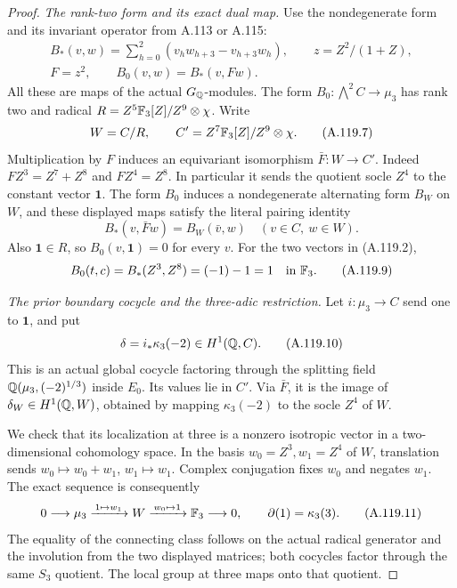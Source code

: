 \begin{proof}
\emph{The rank-two form and its exact dual map.}
Use the nondegenerate form and its invariant operator
from A.113 or A.115:
\[
 \begin{gathered}
 B_*(v,w)=\sum_{h=0}^2(v_hw_{h+3}-v_{h+3}w_h),
 \qquad z=Z^2/(1+Z),\\
 F=z^2,\qquad B_0(v,w)=B_*(v,Fw).
 \end{gathered}
 \tag{A.119.6}
\]
All these are maps of the actual \(G_\mathbb Q\)-modules.
The form \(B_0:\bigwedge^2C\to\mu_3\) has rank two
and radical \(R=Z^5\mathbb F_3[Z]/Z^9\otimes\chi\).
Write
\[
 W=C/R,\qquad C'=Z^7\mathbb F_3[Z]/Z^9\otimes\chi.
 \tag{A.119.7}
\]
Multiplication by \(F\) induces an equivariant
isomorphism \(\bar F:W\longrightarrow C'\).
Indeed \(FZ^3=Z^7+Z^8\) and \(FZ^4=Z^8\).
In particular it sends the quotient socle \(Z^4\)
to the constant vector \(\mathbf1\).
The form \(B_0\) induces a nondegenerate alternating
form \(B_W\) on \(W\), and these displayed maps
satisfy the literal pairing identity
\[
 B_*(v,\bar Fw)=B_W(\bar v,w)
                         \quad(v\in C,\ w\in W).
 \tag{A.119.8}
\]
Also \(\mathbf1\in R\), so
\(B_0(v,\mathbf1)=0\) for every \(v\).
For the two vectors in (A.119.2),
\[
       B_0(t,c)=B_*(Z^3,Z^8)=(-1)-1=1
                                      \quad\hbox{in }\mathbb F_3.
 \tag{A.119.9}
\]

\emph{The prior boundary cocycle and the three-adic restriction.}
Let \(i:\mu_3\to C\) send one to \(\mathbf1\), and
put
\[
                  \delta=i_*\kappa_3(-2)\in H^1(\mathbb Q,C).
 \tag{A.119.10}
\]
This is an actual global cocycle factoring through
the splitting field \(\mathbb Q(\mu_3,(-2)^{1/3})\)
inside \(E_0\).
Its values lie in \(C'\).
Via \(\bar F\), it is the image of
\(\delta_W\in H^1(\mathbb Q,W)\), obtained by mapping
\(\kappa_3(-2)\) to the socle \(Z^4\) of \(W\).

We check that its localization at three is a
nonzero isotropic vector in a two-dimensional
cohomology space.
In the basis \(w_0=Z^3,w_1=Z^4\) of \(W\),
translation sends
\(w_0\mapsto w_0+w_1\), \(w_1\mapsto w_1\).
Complex conjugation fixes \(w_0\) and negates
\(w_1\).
The exact sequence is consequently
\[
 0\longrightarrow\mu_3
   \xrightarrow{\,1\mapsto w_1\,}W
   \xrightarrow{\,w_0\mapsto1\,}\mathbb F_3
   \longrightarrow0,
 \qquad \partial(1)=\kappa_3(3).
 \tag{A.119.11}
\]
The equality of the connecting class follows on
the actual radical generator and the involution
from the two displayed matrices; both cocycles
factor through the same \(S_3\) quotient.
The local group at three maps onto that quotient.


\end{proof}
